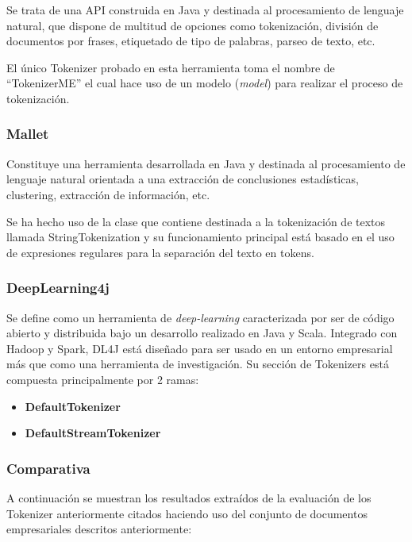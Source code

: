 \documentclass[runningheads,a4paper]{llncs}
\theoremstyle{break}
\begin{document}
Se trata de una API construida en Java y destinada al procesamiento de lenguaje natural, que dispone de multitud de opciones como tokenización, división de documentos por frases, etiquetado de tipo de palabras, parseo de texto, etc. 

El único Tokenizer probado en esta herramienta toma el nombre de “TokenizerME” el cual hace uso de un modelo (\textit{model}) para realizar el proceso de tokenización.

\subsubsection{Mallet}
\textbf{}

Constituye una herramienta desarrollada en Java y destinada al procesamiento de lenguaje natural orientada a una extracción de conclusiones estadísticas, clustering, extracción de información, etc. 

Se ha hecho uso de la clase que contiene destinada a la tokenización de textos llamada StringTokenization y su funcionamiento principal está basado en el uso de expresiones regulares para la separación del texto en tokens.

\subsubsection{DeepLearning4j}
\textbf{}

Se define como un herramienta de \textit{deep-learning} caracterizada por ser de código abierto y distribuida bajo un desarrollo realizado en Java y Scala. Integrado con Hadoop y Spark, DL4J está diseñado para ser usado en un entorno empresarial más que como una herramienta de investigación. Su sección de Tokenizers está compuesta principalmente por 2 ramas:


\begin{itemize}
	\item \textbf{DefaultTokenizer}
    \item \textbf{DefaultStreamTokenizer}
\end{itemize}

\newpage

\subsubsection{Comparativa}
\textbf{}

A continuación se muestran los resultados extraídos de la evaluación de los Tokenizer anteriormente citados haciendo uso del conjunto de documentos empresariales descritos anteriormente:
\end{document}
